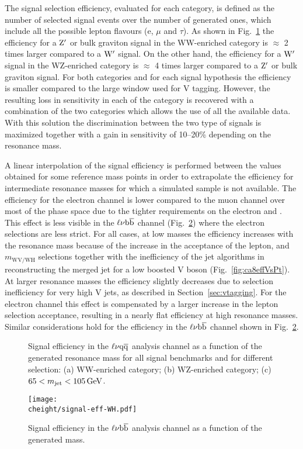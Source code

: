 The signal selection efficiency, evaluated for each category, is defined as the number of selected signal events over the number of generated ones, which include all the possible lepton flavours (e, $\mu$ and $\tau$).
As shown in Fig.~\ref{fig:effWV-13TeV} the efficiency for a $\mathrm{Z}^\prime$ or bulk graviton signal in the WW-enriched category is $\approx$ 2 times larger compared to a $\mathrm{W}^\prime$ signal. On the other hand, the efficiency for a $\mathrm{W}^\prime$ signal in the WZ-enriched category is $\approx$ 4 times larger compared to a $\mathrm{Z}^\prime$ or bulk graviton signal. For both categories and for each signal hypothesis the efficiency is smaller compared to the large \mJ window used for V tagging. However, the resulting loss in sensitivity in each of the category is recovered with a combination of the two \mJ categories which allows the use of all the available data. With this solution the discrimination between the two type of signals is maximized together with a gain in sensitivity of 10--20\% depending on the resonance mass.

A linear interpolation of the signal efficiency is performed between the values obtained for some reference mass points in order to extrapolate the efficiency for intermediate resonance masses for which a simulated sample is not available.
The efficiency for the electron channel is lower compared to the muon channel over most of the phase space due to the tighter requirements on the electron \pt and \ETmiss. This effect is less visible in the $\ell\nu{\mathrm{b}\overline{\mathrm{b}}}$ channel (Fig.~\ref{fig:effWH-8TeV}) where the electron selections are less strict. For all cases, at low masses the efficiency increases with the resonance mass because of the increase in the acceptance of the lepton, \ETmiss and $m_\mathrm{WV/WH}$ selections together with the inefficiency of the jet algorithms in reconstructing the merged jet for a low boosted V boson (Fig.~\ref{fig:ca8effVsPt}). At larger resonance masses the efficiency slightly decreases due to \nsubj selection inefficiency for very high \pt V jets, as described in Section~\ref{sec:vtagging}.
For the electron channel this effect is compensated by a larger increase in the lepton selection acceptance, resulting in a nearly flat efficiency at high resonance masses.
Similar considerations hold for the efficiency in the $\ell\nu{\mathrm{b}\overline{\mathrm{b}}}$ channel shown in Fig.~\ref{fig:effWH-8TeV}.

\begin{figure}[!htb]
\centering
{}
\caption{Signal efficiency in the $\ell\nu\mathrm{q}\overline{\mathrm{q}}$ analysis channel as a function of the generated resonance mass for all signal benchmarks and for different \mJ selection: (a) WW-enriched category; (b) WZ-enriched category; (c) $65 < m_{\text{jet}} < 105\,\text{Ge\hspace{-.08em}V}$.}
\label{fig:effWV-13TeV}
\end{figure}

\begin{figure}[!htb]
\centering
\texttt{[image: \\cheight/signal-eff-WH.pdf]}
\caption{Signal efficiency in the $\ell\nu{\mathrm{b}\overline{\mathrm{b}}}$ analysis channel as a function of the generated \Wpr mass.}
\label{fig:effWH-8TeV}
\end{figure}